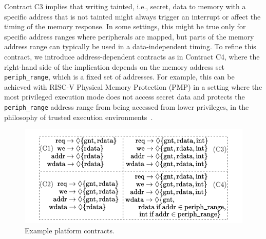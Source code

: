 Contract C3 implies that writing tainted, i.e., secret, data to memory with a specific address that is not tainted might always trigger an interrupt or affect the timing of the memory response.
In some settings, this might be true only for specific address ranges where peripherals are mapped, but parts of the memory address range can typically be used in a data-independent timing.
To refine this contract, we introduce address-dependent contracts as in Contract C4, where the right-hand side of the implication depends on the memory address set \texttt{periph\_range}, which is a fixed set of addresses.
For example, this can be achieved with RISC-V Physical Memory Protection (PMP) in a setting where the most privileged execution mode does not access secret data and protects the \texttt{periph\_range} address range from being accessed from lower privileges, in the philosophy of trusted execution environments~\cite{lee2019keystone,costan2016sanctum,arm2009trustzone,mcgillion2015opentee,schneider2022sok,bourgeat2018mi6,brasser2022tcx}.



\begin{figure}
    \begin{center}
    \includegraphics[width=\columnwidth]{figures/contract_equations/contract_equations.pdf}
    \end{center}
    \vspace{-1.8em}
    \caption{Example platform contracts.}
    \label{fig:contract_equations}
    \vspace*{-1.5em} 
\end{figure}

